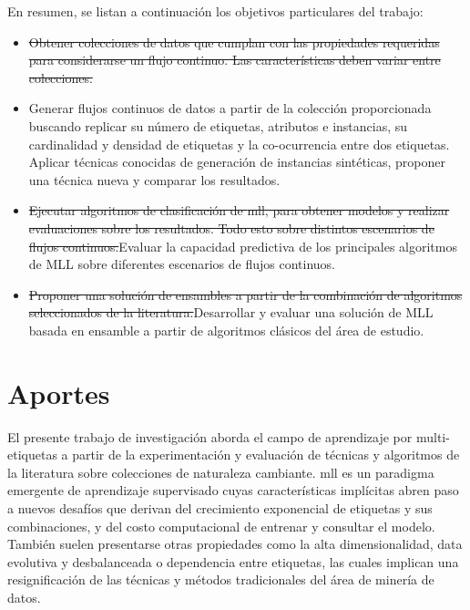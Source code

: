 En resumen, se listan a continuación los objetivos particulares del trabajo:

\begin{itemize}

	\item \sout{Obtener colecciones de datos que cumplan con las propiedades
		      requeridas para considerarse un flujo continuo. Las características
		      deben variar entre colecciones.}

	\item Generar flujos continuos de datos a partir de la colección
	      proporcionada buscando replicar su número de etiquetas, atributos e
	      instancias, su cardinalidad y densidad de etiquetas y la co-ocurrencia
	      entre dos etiquetas. Aplicar técnicas conocidas de generación de
	      instancias sintéticas, proponer una técnica nueva y comparar los
	      resultados.

	\item \sout{Ejecutar algoritmos de clasificación de \acrshort{mll}, para
		      obtener modelos y realizar evaluaciones sobre los resultados. Todo esto
		      sobre distintos escenarios de flujos continuos.}Evaluar la capacidad
	      predictiva de los principales algoritmos de MLL sobre diferentes escenarios
	      de flujos continuos.

	\item \sout{Proponer una solución de ensambles a partir de la combinación de
		      algoritmos seleccionados de la literatura.}Desarrollar y evaluar una
	      solución de MLL basada en ensamble a partir de algoritmos clásicos del
	      área de estudio.

\end{itemize}


\section{Aportes}

El presente  trabajo de investigación aborda el campo de aprendizaje por
multi-etiquetas a partir de la experimentación y evaluación de técnicas y
algoritmos de la literatura sobre colecciones de naturaleza cambiante.
\acrshort{mll} es un paradigma emergente de aprendizaje supervisado cuyas
características implícitas abren paso a nuevos desafíos que derivan del
crecimiento exponencial de etiquetas y sus combinaciones, y del costo
computacional de entrenar y consultar el modelo. También suelen presentarse
otras propiedades como la alta dimensionalidad, data evolutiva y desbalanceada o
dependencia entre etiquetas, las cuales implican una resignificación de las
técnicas y métodos tradicionales del área de minería de datos.

